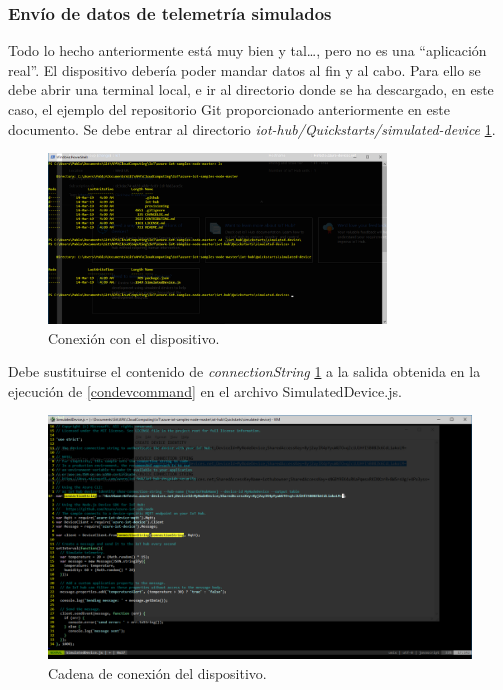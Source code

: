 \documentclass[english,runningheads,a4paper]{llncs}[2018/03/10]
\begin{document}
\subsubsection{Envío de datos de telemetría simulados}

Todo lo hecho anteriormente está muy bien y tal\ldots, pero no es una
``aplicación real''. El dispositivo debería poder mandar datos al fin y al cabo.
Para ello se debe abrir una terminal local, e ir al directorio donde se ha
descargado, en este caso, el ejemplo del repositorio Git proporcionado
anteriormente en este documento. Se debe entrar al directorio
\textit{iot-hub/Quickstarts/simulated-device}
\hyperref[directory]{\ref{directory}}.

\begin{figure}[h!]
 \centering
 \includegraphics[width=0.8\textwidth]{./IoT/MicrosoftAzure/4-1_send_simulated_telemetry.png}
 \caption{Conexión con el dispositivo.}
 \label{directory}
\end{figure}

Debe sustituirse el contenido de \textit{connectionString}
\hyperref[directory]{\ref{directory}} a la salida obtenida en la ejecución de 
\hyperref[condevcommand]{\ref{condevcommand}} en el archivo SimulatedDevice.js.

\begin{figure}[h!]
 \centering
 \includegraphics[width=\textwidth]{./IoT/MicrosoftAzure/4-2_send_simulated_telemetry.png}
 \caption{Cadena de conexión del dispositivo.}
 \label{codestring}
\end{figure}
\end{document}
